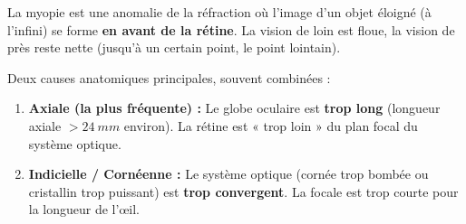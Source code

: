 \documentclass[11pt]{article}
\newcommand{\cle}[1]{{\popxbold\color{popdark}#1}}
\begin{document}
\begin{definition}[Myopie]
La \cle{myopie} est une anomalie de la réfraction où l'image d'un objet éloigné (à l'infini) se forme \textbf{en avant de la rétine}. La vision de loin est floue, la vision de près reste nette (jusqu'à un certain point, le \cle{point lointain}).
\end{definition}

\begin{propriete}
Deux causes anatomiques principales, souvent combinées :
\begin{enumerate}
    \item \textbf{Axiale (la plus fréquente) :} Le globe oculaire est \textbf{trop long} (longueur axiale $> \SI{24}{mm}$ environ). La rétine est « trop loin » du plan focal du système optique.
    \item \textbf{Indicielle / Cornéenne :} Le système optique (cornée trop bombée ou cristallin trop puissant) est \textbf{trop convergent}. La focale est trop courte pour la longueur de l'œil.
\end{enumerate}
\end{propriete}
\end{document}
